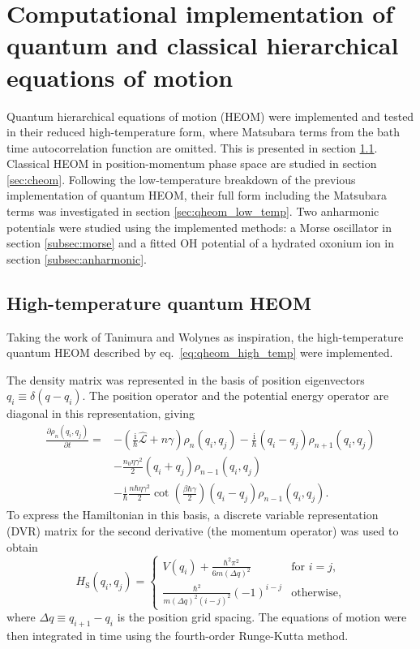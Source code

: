 \chapter{Computational implementation of quantum and classical hierarchical equations of motion}
Quantum hierarchical equations of motion (HEOM) were implemented and tested in their reduced high-temperature form, where Matsubara terms from the bath time autocorrelation function are omitted. This is presented in section \ref{sec:qheom}. Classical HEOM in position-momentum phase space are studied in section \ref{sec:cheom}. Following the low-temperature breakdown of the previous implementation of quantum HEOM, their full form including the Matsubara terms was investigated in section \ref{sec:qheom_low_temp}. Two anharmonic potentials were studied using the implemented methods: a Morse oscillator in section \ref{subsec:morse} and a fitted OH potential of a hydrated oxonium ion in section \ref{subsec:anharmonic}.
\clearpage
\section{High-temperature quantum HEOM}\label{sec:qheom}
Taking the work of Tanimura and Wolynes as inspiration,\supercite{Tanimura1991a} the high-temperature quantum HEOM described by eq.~\ref{eq:qheom_high_temp} were implemented.

The density matrix was represented in the basis of position eigenvectors $q_i \equiv \delta(q-q_i)$. The position operator and the potential energy operator are diagonal in this representation, giving
\begin{equation}
\begin{split}
\frac{\partial \rho_{n}(q_i,q_j) }{\partial t} =
&-\left(\frac{\mathrm{i}}{\hbar}\hat{\mathcal{L}}+n \gamma \right)\rho_{n}(q_i,q_j)
-\frac{\mathrm{i}}{\hbar}(q_i - q_j) \rho_{n+1}(q_i,q_j) \\
&-\frac{n_0 \eta\gamma^2}{2}(q_i + q_j) \rho_{n-1}(q_i,q_j) \\
&-\frac{\mathrm{i}}{\hbar}\frac{n \hbar \eta \gamma^2}{2}\cot\left(\frac{\beta\hbar\gamma}{2}\right)(q_i - q_j) \rho_{n-1}(q_i,q_j).
\end{split}
\end{equation}
To express the Hamiltonian in this basis, a discrete variable representation (DVR) matrix for the second derivative (the momentum operator) was used to obtain\supercite{Colbert1992}
\begin{equation}
	H_\mathrm{S}(q_i,q_j) =
	 \begin{cases}
	 V(q_i) +\frac{\hbar^2\pi^2}{6 m (\Delta q)^2}& \text{for }i=j, \\
	 \frac{\hbar^2 }{m (\Delta q)^2 (i-j)^2}(-1)^{i-j} & \text{otherwise,}
	 \end{cases}
	 \label{eq:dvr_ham}
\end{equation}
where $\Delta q\equiv q_{i+1}-q_i$ is the position grid spacing. The equations of motion were then integrated in time using the fourth-order Runge-Kutta method.\supercite{Press1992, Press1996}

